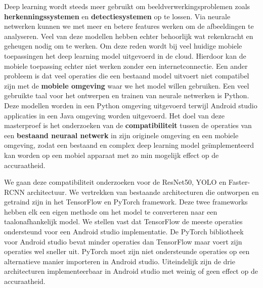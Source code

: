 Deep learning wordt steeds meer gebruikt om beeldverwerkingsproblemen zoals \textbf{herkenningssystemen} en \textbf{detectiesystemen} op te lossen. 
Via neurale netwerken kunnen we met meer en betere features werken om de afbeeldingen te analyseren. 
Veel van deze modellen hebben echter behoorlijk wat rekenkracht en geheugen nodig om te werken.
Om deze reden wordt bij veel huidige mobiele toepassingen het deep learning model uitgevoerd in de cloud.
Hierdoor kan de mobiele toepassing echter niet werken zonder een internetconnectie.
Een ander probleem is dat veel operaties die een bestaand model uitvoert niet compatibel zijn met de \textbf{mobiele omgeving} waar we het model willen gebruiken.
Een veel gebruikte taal voor het ontwerpen en trainen van neurale netwerken is Python.
Deze modellen worden in een Python omgeving uitgevoerd terwijl Android studio applicaties in een Java omgeving worden uitgevoerd.
Het doel van deze masterproef is het onderzoeken van de \textbf{compatibiliteit} tussen de operaties van een \textbf{bestaand neuraal netwerk} in zijn originele omgeving en een mobiele omgeving, zodat een bestaand en complex deep learning model ge\"implementeerd kan worden op een mobiel apparaat met zo min mogelijk effect op de accuraatheid. 

We gaan deze compatibiliteit onderzoeken voor de ResNet50, YOLO en Faster-RCNN architectuur.
We vertrekken van bestaande architecturen die ontworpen en getraind zijn in het TensorFlow en PyTorch framework.
Deze twee frameworks hebben elk een eigen methode om het model te converteren naar een taalonafhankelijk model.
We stellen vast dat TensorFlow de meeste operaties ondersteund voor een Android studio implementatie.
De PyTorch bibliotheek voor Android studio bevat minder operaties dan TensorFlow maar voert zijn operaties wel sneller uit.
PyTorch moet zijn niet ondersteunde operaties op een alternatieve manier importeren in Android studio.
Uiteindelijk zijn de drie architecturen implementeerbaar in Android studio met weinig of geen effect op de accuraatheid.

